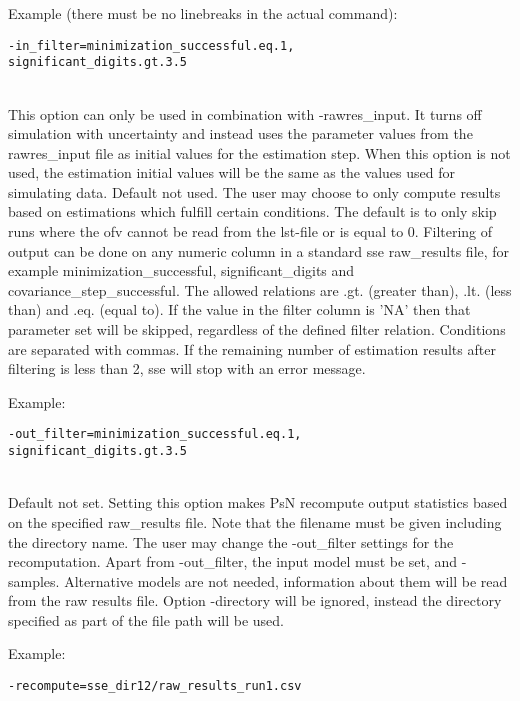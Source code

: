 \begin{optionlist}
Example (there must be no linebreaks in the actual command):
\begin{verbatim}
-in_filter=minimization_successful.eq.1,
significant_digits.gt.3.5
\end{verbatim} \\
\nextopt
{}
This option can only be used in combination with -rawres\_input. It turns off 
simulation with uncertainty and instead uses the parameter values from the 
rawres\_input file as initial values for the estimation step. When this 
option is not used, the estimation initial values will be the same as the values
used for simulating data.
\nextopt
{}
Default not used. The user may choose to only compute results based on estimations which fulfill certain conditions. The default is to only skip runs where the ofv cannot be read from the lst-file or is equal to 0. Filtering of output can be done on any numeric column in a standard sse raw\_results file, for example minimization\_successful, significant\_digits and covariance\_step\_successful. The allowed relations are .gt. (greater than), .lt. (less than) and .eq. (equal to). If the value in the filter column is 'NA' then that parameter set will be skipped, regardless of the defined filter relation. Conditions are separated with commas. If the remaining number of estimation results after filtering is less than 2, sse will stop with an error message.

Example:
\begin{verbatim}
-out_filter=minimization_successful.eq.1,
significant_digits.gt.3.5
\end{verbatim} \\
\nextopt
{}
Default not set. Setting this option makes PsN recompute output statistics based on the specified raw\_results file. Note that the filename must be given including the directory name. The user may change the -out\_filter settings for the recomputation. Apart from -out\_filter, the input model must be set, and -samples. Alternative models are not needed, information about them will be read from the raw results file. Option -directory will be ignored, instead the directory specified as part of the file path will be used.


Example:
\begin{verbatim}
-recompute=sse_dir12/raw_results_run1.csv
\end{verbatim}
\nextopt
\end{optionlist}

